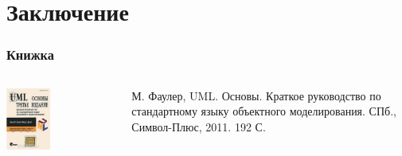 \documentclass[xetex,mathserif,serif]{beamer}
\begin{document}
	\section{Заключение}

	\begin{frame}
		\frametitle{Книжка}
		\begin{columns}
			\begin{column}{0.5\textwidth}
				\begin{center}
					\includegraphics[width=0.4\textwidth]{umlBookCover.png}
				\end{center}
			\end{column}
			\begin{column}{0.5\textwidth}
				М. Фаулер, UML. Основы. Краткое руководство по стандартному языку объектного моделирования. СПб., Символ-Плюс, 2011. 192 С.
			\end{column}
		\end{columns}
	\end{frame}
\end{document}
